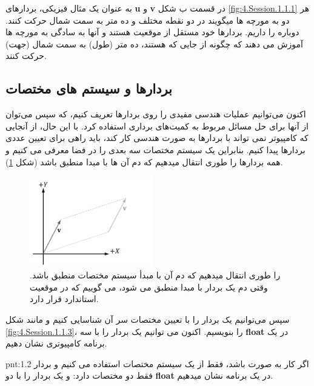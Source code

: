 {\begin{spacing}{1.4}
        به عنوان یک مثال فیزیکی، بردارهای \textbf{u} و \textbf{v} در قسمت ب شکل \ref{fig:4.Session.1.1.1} هر دو به مورچه ها میگویند در دو نقطه مختلف  و  ده متر به سمت شمال حرکت کنند.
        دوباره  را داریم.
        بردارها خود مستقل از موقعیت هستند و
        آنها به سادگی به مورچه ها آموزش می دهند که چگونه از جایی که هستند، ده متر (طول) به سمت شمال (جهت) حرکت کنند.

    \end{spacing}
}

\subsection{\textbf{بردارها و سیستم های مختصات}}
{
    \Large
    \begin{spacing}{1.5}
        اکنون می‌توانیم عملیات هندسی مفیدی را روی بردارها تعریف کنیم، که سپس می‌توان از آنها برای حل مسائل مربوط به کمیت‌های برداری استفاده کرد.
        با این حال، از آنجایی که کامپیوتر نمی تواند با بردارها به صورت هندسی کار کند، باید راهی برای تعیین عددی بردارها پیدا کنیم.
        بنابراین یک سیستم مختصات سه بعدی را در فضا معرفی می کنیم و همه بردارها را طوری انتقال میدهیم که دم آن ها با مبدا منطبق باشد (شکل \ref{fig:4.Session.1.1.2}).

        \begin{figure}[H]
            \centering
            \setlength{\belowcaptionskip}{-10pt}
            \includegraphics[width=0.48\textwidth]{Images/4/1/4.Session.1.1.2}
            \caption{ را طوری انتقال میدهیم که دم آن با مبدأ سیستم مختصات منطبق
            باشد. وقتی دم یک بردار با مبدا منطبق می شود، می گوییم که در موقعیت استاندارد قرار دارد.}
            \label{fig:4.Session.1.1.2}
        \end{figure}

        سپس می‌توانیم یک بردار را با تعیین مختصات سر آن شناسایی کنیم و مانند شکل \ref{fig:4.Session.1.1.3}،  را بنویسیم.
        اکنون می توانیم یک بردار را با سه \textbf{float} در یک برنامه کامپیوتری نشان دهیم.
        \textbf{\vspace{-10pt}}
        \begin{point}{pnt:1.2}
            \Large
            اگر کار به صورت  باشد، فقط از یک سیستم مختصات  استفاده می کنیم و بردار فقط دو مختصات دارد:
             و یک بردار را با دو \textbf{float} در یک برنامه نشان میدهیم.
        \end{point}


\end{spacing}}
